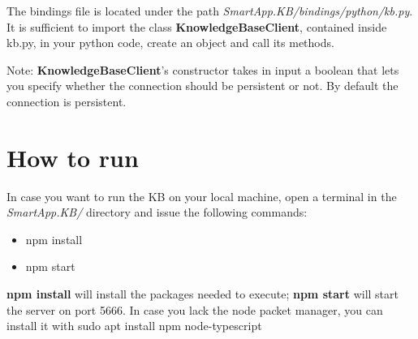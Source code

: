 \documentclass{article}
\begin{document}
The bindings file is located under the path \textit{SmartApp.KB/bindings/python/kb.py}. It is sufficient to import the class \textbf{KnowledgeBaseClient}, contained inside kb.py, in your python code, create an object and call its methods.

Note: \textbf{KnowledgeBaseClient}'s constructor takes in input a boolean that lets you specify whether the connection should be persistent or not. By default the connection is persistent.

\section{How to run}
In case you want to run the KB on your local machine, open a terminal in the \textit{SmartApp.KB/} directory and issue the following commands:
\begin{itemize}
    \item npm install
    \item npm start
\end{itemize}
    
\textbf{npm install} will install the packages needed to execute; \textbf{npm start} will start the server on port 5666. In case you lack the node packet manager, you can install it with sudo apt install npm node-typescript
\end{document}
